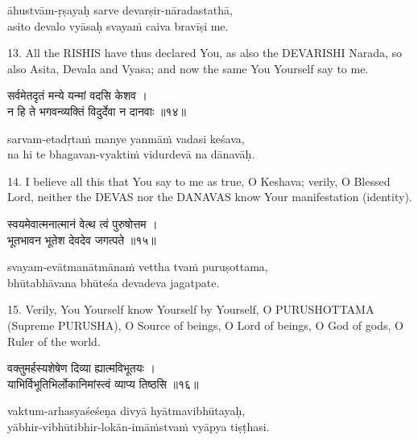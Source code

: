 \begin{transliteration}
āhustvām-ṛṣayaḥ sarve devarṣir-nāradastathā, \\
asito devalo vyāsaḥ svayaṁ caiva bravīṣi me.
\end{transliteration}

13. All the RISHIS have thus declared You, as also the DEVARISHI Narada, so
also Asita, Devala and Vyasa; and now the same You Yourself say to me.

\begin{gitaverse}
सर्वमेतदृतं मन्ये यन्मां वदसि केशव । \\
न हि ते भगवन्व्यक्तिं विदुर्देवा न दानवाः ॥१४॥
\end{gitaverse}

\begin{transliteration}
sarvam-etadṛtaṁ manye yanmāṁ vadasi keśava, \\
na hi te bhagavan-vyaktiṁ vidurdevā na dānavāḥ.
\end{transliteration}

14. I believe all this that You say to me as true, O Keshava; verily, O Blessed
Lord, neither the DEVAS nor the DANAVAS know Your manifestation (identity).

\begin{gitaverse}
स्वयमेवात्मनात्मानं वेत्थ त्वं पुरुषोत्तम । \\
भूतभावन भूतेश देवदेव जगत्पते ॥१५॥
\end{gitaverse}

\begin{transliteration}
svayam-evātmanātmānaṁ vettha tvaṁ puruṣottama, \\
bhūtabhāvana bhūteśa devadeva jagatpate.
\end{transliteration}

15. Verily, You Yourself know Yourself by Yourself, O PURUSHOTTAMA (Supreme
PURUSHA), O Source of beings, O Lord of beings, O God of gods, O Ruler of the
world.

\begin{gitaverse}
वक्तुमर्हस्यशेषेण दिव्या ह्यात्मविभूतयः । \\
याभिर्विभूतिभिर्लोकानिमांस्त्वं व्याप्य तिष्ठसि ॥१६॥
\end{gitaverse}

\begin{transliteration}
vaktum-arhasyaśeśeṇa divyā hyātmavibhūtayaḥ, \\
yābhir-vibhūtibhir-lokān-imāṁstvaṁ vyāpya tiṣṭhasi.
\end{transliteration}


